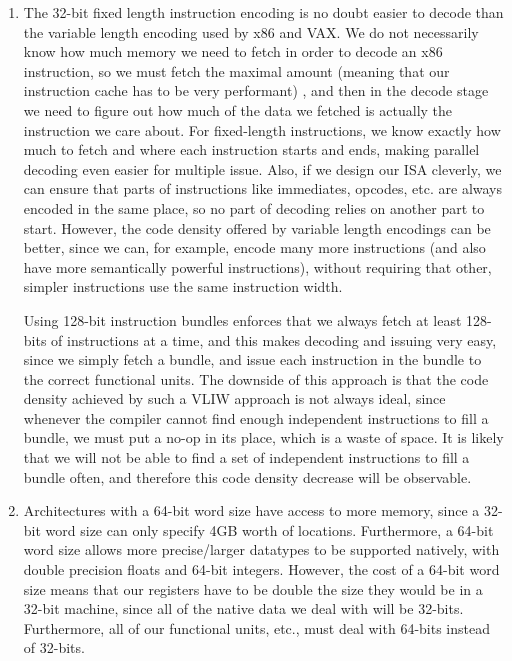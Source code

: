 


\begin{enumerate}[label=(\alph*)]
  \item

    The 32-bit fixed length instruction encoding is no doubt easier to decode than the variable length encoding used by x86 and VAX. We do not necessarily know how much memory we need to fetch in order to decode an x86 instruction, so we must fetch the maximal amount (meaning that our instruction cache has to be very performant) , and then in the decode stage we need to figure out how much of the data we fetched is actually the instruction we care about. For fixed-length instructions, we know exactly how much to fetch and where each instruction starts and ends, making parallel decoding even easier for multiple issue. Also, if we design our ISA cleverly, we can ensure that parts of instructions like immediates, opcodes, etc. are always encoded in the same place, so no part of decoding relies on another part to start. However, the code density offered by variable length encodings can be better, since we can, for example, encode many more instructions (and also  have more semantically powerful instructions), without requiring that other, simpler instructions use the same instruction width.

    Using 128-bit instruction bundles enforces that we always fetch at least 128-bits of instructions at a time, and this makes decoding and issuing very easy, since we simply fetch a bundle, and issue each instruction in the bundle to the correct functional units. The downside of this approach is that the code density achieved by such a VLIW approach is not always ideal, since whenever the compiler cannot find enough independent instructions to fill a bundle, we must put a no-op in its place, which is a waste of space. It is likely that we will not be able to find a set of independent instructions to fill a bundle often, and therefore this code density decrease will be observable.

  \item

    Architectures with a 64-bit word size have access to more memory, since a 32-bit word size can only specify 4GB worth of locations. Furthermore, a 64-bit word size allows more precise/larger datatypes to be supported natively, with double precision floats and 64-bit integers. However, the cost of a 64-bit word size means that our registers have to be double the size they would be in a 32-bit machine, since all of the native data we deal with will be 32-bits. Furthermore, all of our functional units, etc., must deal with 64-bits instead of 32-bits.


\end{enumerate}
